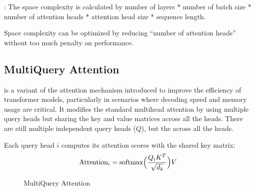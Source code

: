 \documentclass[letterpaper,11pt,english]{sphinxmanual}
\begin{document}
\sphinxAtStartPar
{}: The space
complexity is calculated by number of layers * number of batch size * number
of attention heads * attention head size * sequence length.

\sphinxAtStartPar
Space complexity can be optimized by reducing “number of attention
heads” without too much penalty on performance.


\subsection{Multi\sphinxhyphen{}Query Attention}
\label{\detokenize{pretraining:multi-query-attention}}
\sphinxAtStartPar
{} is a variant of the attention mechanism
introduced to improve the efficiency of transformer models, particularly
in scenarios where decoding speed and memory usage are critical. It
modifies the standard multi\sphinxhyphen{}head attention by using multiple query heads
but sharing the key and value matrices across all the heads. There are
still multiple independent query heads (\(Q\)), but the  across all the
heads.

\sphinxAtStartPar
Each query head \(i\) computes its attention scores with the shared
key matrix:
\begin{equation*}
\begin{split}\text{Attention}_i = \text{softmax} \Big({Q_i K^T \over \sqrt{d_k}}\Big)V\end{split}
\end{equation*}
\begin{figure}[htbp]
\centering
\capstart

\noindent{}
\caption{Multi\sphinxhyphen{}Query Attention}\label{\detokenize{pretraining:id13}}\end{figure}
\end{document}
